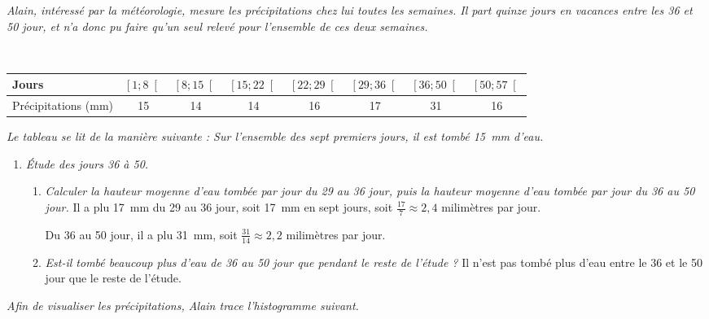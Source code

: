 \documentclass[11pt]{article}
\begin{document}
\begin{exercice}
  \emph{Alain, intéressé par la météorologie, mesure les précipitations chez lui
    toutes les semaines. Il part quinze jours en vacances entre les 36 et 50 jour, et n'a donc pu faire qu'un seul relevé pour l'ensemble de ces deux semaines.}
  
  ~

  \hspace{-2.5em}\begin{tabular}{p{2cm}||c|c|c|c|c|c|c}
    Jours &
    $\left[ 1; 8 \right[$ &
    $\left[ 8; 15 \right[$ &
    $\left[ 15; 22 \right[$ &
    $\left[ 22; 29 \right[$ &
    $\left[ 29; 36 \right[$ &
    $\left[ 36; 50 \right[$ &
    $\left[ 50; 57 \right[$ \\
    \hline
    Précipita\-tions (mm) & 15 & 14 & 14 & 16 & 17 & 31 & 16 \\
  \end{tabular}

  \emph{Le tableau se lit de la manière suivante : Sur l'ensemble des sept premiers jours, il est tombé 15~mm d'eau.}

  \begin{enumerate}
    \item \emph{Étude des jours 36 à 50.}
      \begin{enumerate}
        \item \emph{Calculer la hauteur moyenne d'eau tombée par jour du 29 au 36 jour, puis la hauteur moyenne d'eau tombée par jour du 36 au 50 jour.}
          Il a plu 17~mm du 29 au 36 jour, soit 17~mm en sept jours, soit $\frac{17}{7}\approx2,4$ milimètres par jour.

          Du 36 au 50 jour, il a plu 31~mm, soit $\frac{31}{14}\approx2,2$ milimètres par jour.
        \item \emph{Est-il tombé beaucoup plus d'eau de 36 au 50 jour que pendant le reste de l'étude ?}
          Il n'est pas tombé plus d'eau entre le 36 et le 50 jour que le reste de l'étude.
      \end{enumerate}
  \end{enumerate}

  \emph{Afin de visualiser les précipitations, Alain trace l'histogramme suivant.}


\end{exercice}
\end{document}
